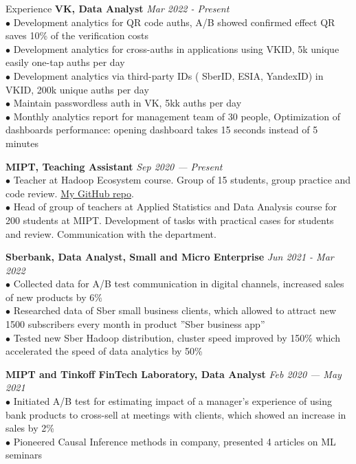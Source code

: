 \documentclass{resume} %
\begin{document}
\begin{rSection}{ Experience }
    { \bf VK, Data Analyst} \hfill {\em Mar 2022 - Present}\\
    { $\bullet$ Development analytics for QR code auths, A/B showed confirmed effect QR saves 10\% of the verification costs} \\
    { $\bullet$ Development analytics for cross-auths in applications using VKID, 5k unique easily one-tap auths per day}\\
    { $\bullet$ Development analytics via third-party IDs ( SberID, ESIA, YandexID) in VKID, 200k unique auths per day}\\
    { $\bullet$ Maintain passwordless auth in VK, 5kk auths per day }\\
    { $\bullet$ Monthly analytics report for management team of 30 people, Optimization of dashboards performance: opening dashboard takes 15 seconds instead of 5 minutes}
    
    { \bf MIPT, Teaching Assistant} \hfill {\em Sep 2020 — Present}\\
    { $\bullet$ Teacher at Hadoop Ecosystem course. Group of 15 students, group practice and code review. \href{https://github.com/YHx07/pd-seminars}{My GitHub repo}.}\\
    { $\bullet$ Head of group of teachers at Applied Statistics and Data Analysis course for 200 students at MIPT. Development of tasks with practical cases for students and review. Communication with the department. }

    { \bf Sberbank, Data Analyst, Small and Micro Enterprise} \hfill {\em Jun 2021 - Mar 2022}\\
    { $\bullet$ Collected data for A/B test communication in digital channels, increased sales of new products by 6\% }\\
    { $\bullet$ Researched data of Sber small business clients, which allowed to attract new 1500 subscribers every month in product ''Sber business app'' }\\
    { $\bullet$ Tested new Sber Hadoop distribution, cluster speed improved by 150\% which accelerated the speed of data analytics by 50\%}
    
    { \bf MIPT and Tinkoff FinTech Laboratory, Data Analyst } \hfill {\em Feb 2020 — May 2021}\\
    { $\bullet$ Initiated A/B test for estimating impact of a manager's experience of using bank products to cross-sell at meetings with clients, which showed an increase in sales by 2\% }\\
    { $\bullet$ Pioneered Causal Inference methods in company, presented 4 articles on ML seminars }

\end{rSection}
\end{document}
